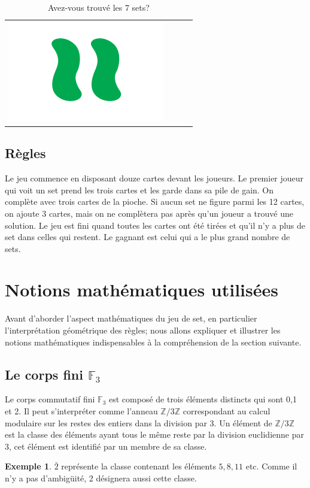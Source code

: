 \documentclass[a4paper,12pt,titlepage]{article}
\theoremstyle{plain}
\theoremstyle{definition}
\newtheorem{ex}{Exemple}
\begin{document}
\begin{table}[h]
\begin{tabular}{ c | c | c | c }
\includegraphics[scale=0.2]{Img/1011.png} \\
\end{tabular}
\caption{Avez-vous trouvé les 7 sets?}
\end{table}

\subsection{Règles}
Le jeu commence en disposant douze cartes devant les joueurs.
Le premier joueur qui voit un set prend les trois cartes et les garde dans sa pile de gain. 
On complète avec trois cartes de la pioche. Si aucun set ne figure parmi les 12 cartes, on ajoute 3 cartes, mais on ne complètera pas après qu'un joueur a trouvé une solution.
Le jeu est fini quand toutes les cartes ont été tirées et qu'il n'y a plus de set dans celles qui restent.
Le gagnant est celui qui a le plus grand nombre de sets. 

\newpage
\section{Notions mathématiques utilisées}
Avant d'aborder l'aspect mathématiques du jeu de set, en particulier l'interprétation géométrique des règles; nous allons expliquer et illustrer les notions mathématiques indispensables à la compréhension de la section suivante. 

\subsection{Le corps fini $\mathbb{F}_3$}
Le corps commutatif fini $\mathbb{F}_3$ est composé de trois éléments distincts qui sont 0,1 et 2. Il peut s'interpréter comme l'anneau $\mathbb{Z}/3\mathbb{Z}$ correspondant au calcul modulaire sur les restes des entiers dans la division par 3. Un élément de $\mathbb{Z}/3\mathbb{Z}$ est la classe des éléments ayant tous le même reste par la division euclidienne par 3, cet élément est identifié par un membre de sa classe.
\begin{ex}
$\bar{2}$ représente la classe contenant les éléments $5,8,11$ etc. Comme il n'y a pas d'ambigüité, 2 désignera aussi cette classe.
\end{ex}
\end{document}
